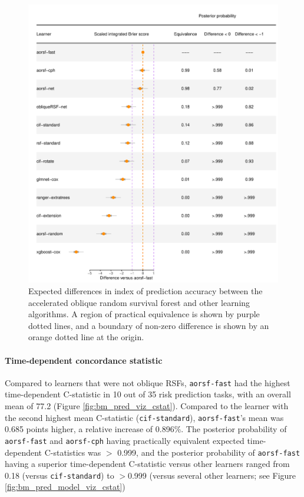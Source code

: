 \documentclass[twoside,11pt]{article}\usepackage[]{graphicx}\usepackage[]{xcolor}
\makeatletter
\def\maxwidth{ %
  \ifdim\Gin@nat@width>\linewidth
    \linewidth
  \else
    \Gin@nat@width
  \fi
}
\newenvironment{knitrout}{}{} %
\makeatother
\begin{document}
\begin{knitrout}
\color{fgcolor}\begin{figure}
\includegraphics[width=\maxwidth]{figure/bm_pred_model_viz_ibs-1} \caption[Expected differences in index of prediction accuracy between the accelerated oblique random survival forest and other learning algorithms]{Expected differences in index of prediction accuracy between the accelerated oblique random survival forest and other learning algorithms. A region of practical equivalence is shown by purple dotted lines, and a boundary of non-zero difference is shown by an orange dotted line at the origin.}\label{fig:bm_pred_model_viz_ibs}
\end{figure}

\end{knitrout}

\paragraph{Time-dependent concordance statistic}




Compared to learners that were not oblique RSFs, \texttt{aorsf-fast} had the highest time-dependent C-statistic in 10 out of 35 risk prediction tasks, with an overall mean of 77.2 (Figure \ref{fig:bm_pred_viz_cstat}). Compared to the learner with the second highest mean C-statistic (\texttt{cif-standard}), \texttt{aorsf-fast}'s mean was 0.685 points higher, a relative increase of 0.896\%. The posterior probability of \texttt{aorsf-fast} and \texttt{aorsf-cph} having practically equivalent expected time-dependent C-statistics was $>$ 0.999, and the posterior probability of \texttt{aorsf-fast} having a superior time-dependent C-statistic versus other learners ranged from 0.18 (versus \texttt{cif-standard}) to $>$0.999 (versus several other learners; see Figure \ref{fig:bm_pred_model_viz_cstat})
\end{document}
